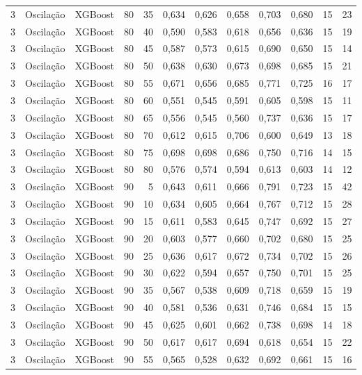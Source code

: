 \begin{longtable}{@{}rllrrrrrrrrr@{}}
3 & Oscilação & XGBoost & 80 & 35 & 0,634 & 0,626 & 0,658 & 0,703 & 0,680 & 15 & 23 \\
3 & Oscilação & XGBoost & 80 & 40 & 0,590 & 0,583 & 0,618 & 0,656 & 0,636 & 15 & 19 \\
3 & Oscilação & XGBoost & 80 & 45 & 0,587 & 0,573 & 0,615 & 0,690 & 0,650 & 15 & 14 \\
3 & Oscilação & XGBoost & 80 & 50 & 0,638 & 0,630 & 0,673 & 0,698 & 0,685 & 15 & 21 \\
3 & Oscilação & XGBoost & 80 & 55 & 0,671 & 0,656 & 0,685 & 0,771 & 0,725 & 16 & 17 \\
3 & Oscilação & XGBoost & 80 & 60 & 0,551 & 0,545 & 0,591 & 0,605 & 0,598 & 15 & 11 \\
3 & Oscilação & XGBoost & 80 & 65 & 0,556 & 0,545 & 0,560 & 0,737 & 0,636 & 15 & 17 \\
3 & Oscilação & XGBoost & 80 & 70 & 0,612 & 0,615 & 0,706 & 0,600 & 0,649 & 13 & 18 \\
3 & Oscilação & XGBoost & 80 & 75 & 0,698 & 0,698 & 0,686 & 0,750 & 0,716 & 14 & 15 \\
3 & Oscilação & XGBoost & 80 & 80 & 0,576 & 0,574 & 0,594 & 0,613 & 0,603 & 14 & 12 \\
3 & Oscilação & XGBoost & 90 & 5 & 0,643 & 0,611 & 0,666 & 0,791 & 0,723 & 15 & 42 \\
3 & Oscilação & XGBoost & 90 & 10 & 0,634 & 0,605 & 0,664 & 0,767 & 0,712 & 15 & 28 \\
3 & Oscilação & XGBoost & 90 & 15 & 0,611 & 0,583 & 0,645 & 0,747 & 0,692 & 15 & 27 \\
3 & Oscilação & XGBoost & 90 & 20 & 0,603 & 0,577 & 0,660 & 0,702 & 0,680 & 15 & 25 \\
3 & Oscilação & XGBoost & 90 & 25 & 0,636 & 0,617 & 0,672 & 0,734 & 0,702 & 15 & 26 \\
3 & Oscilação & XGBoost & 90 & 30 & 0,622 & 0,594 & 0,657 & 0,750 & 0,701 & 15 & 25 \\
3 & Oscilação & XGBoost & 90 & 35 & 0,567 & 0,538 & 0,609 & 0,718 & 0,659 & 15 & 19 \\
3 & Oscilação & XGBoost & 90 & 40 & 0,581 & 0,536 & 0,631 & 0,746 & 0,684 & 15 & 15 \\
3 & Oscilação & XGBoost & 90 & 45 & 0,625 & 0,601 & 0,662 & 0,738 & 0,698 & 14 & 18 \\
3 & Oscilação & XGBoost & 90 & 50 & 0,617 & 0,617 & 0,694 & 0,618 & 0,654 & 15 & 22 \\
3 & Oscilação & XGBoost & 90 & 55 & 0,565 & 0,528 & 0,632 & 0,692 & 0,661 & 15 & 16 \\

\end{longtable}
